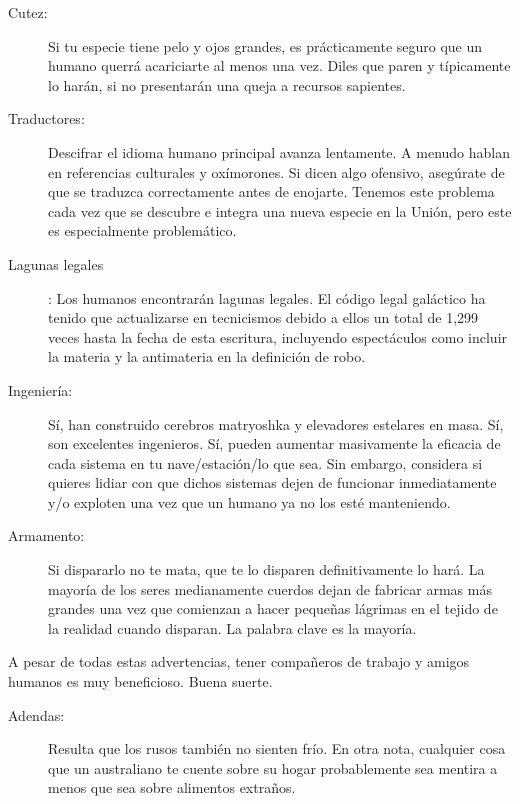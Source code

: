 \documentclass[spanish,12pt,a4paper, oneside]{book}
\begin{document}
\begin{description}
        \item[Cutez:] Si tu especie tiene pelo y ojos grandes, es prácticamente seguro que un humano querrá acariciarte al menos una vez. Diles que paren y típicamente lo harán, si no presentarán una queja a recursos sapientes.

        \item[Traductores:] Descifrar el idioma humano principal avanza lentamente. A menudo hablan en referencias culturales y oxímorones. Si dicen algo ofensivo, asegúrate de que se traduzca correctamente antes de enojarte. Tenemos este problema cada vez que se descubre e integra una nueva especie en la Unión, pero este es especialmente problemático.

        \item[Lagunas legales]: Los humanos encontrarán lagunas legales. El código legal galáctico ha tenido que actualizarse en tecnicismos debido a ellos un total de 1,299 veces hasta la fecha de esta escritura, incluyendo espectáculos como incluir la materia y la antimateria en la definición de robo.

        \item[Ingeniería:] Sí, han construido cerebros matryoshka y elevadores estelares en masa. Sí, son excelentes ingenieros. Sí, pueden aumentar masivamente la eficacia de cada sistema en tu nave/estación/lo que sea. Sin embargo, considera si quieres lidiar con que dichos sistemas dejen de funcionar inmediatamente y/o exploten una vez que un humano ya no los esté manteniendo.

        \item[Armamento:] Si dispararlo no te mata, que te lo disparen definitivamente lo hará. La mayoría de los seres medianamente cuerdos dejan de fabricar armas más grandes una vez que comienzan a hacer pequeñas lágrimas en el tejido de la realidad cuando disparan. La palabra clave es la mayoría.

    \end{description}

    A pesar de todas estas advertencias, tener compañeros de trabajo y amigos humanos es muy beneficioso. Buena suerte.

    \begin{description}

        \item[Adendas:] Resulta que los rusos también no sienten frío. En otra nota, cualquier cosa que un australiano te cuente sobre su hogar probablemente sea mentira a menos que sea sobre alimentos extraños.

    \end{description}
\end{document}
